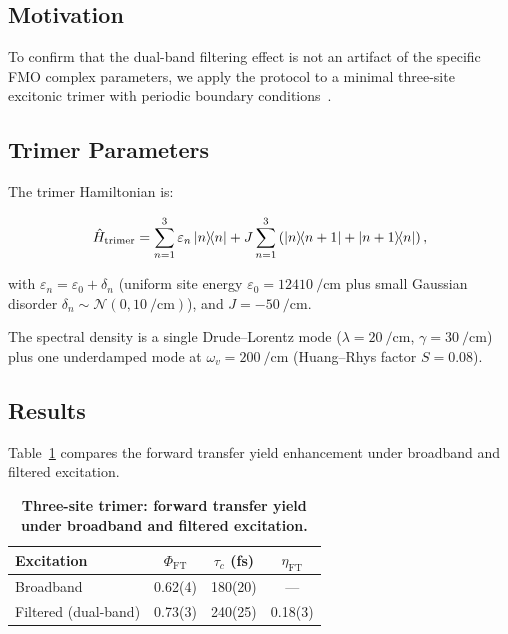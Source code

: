 \documentclass[11pt,a4paper]{article}
\begin{document}
\subsection{Motivation}

To confirm that the dual-band filtering effect is not an artifact of the specific FMO complex parameters, we apply the protocol to a minimal three-site excitonic trimer with periodic boundary conditions~\cite{Mohseni2008,Rebentrost2009,Chin2010}.

\subsection{Trimer Parameters}

The trimer Hamiltonian is:

\begin{equation}
\hat{H}_{\mathrm{trimer}} = \sum_{n=1}^{3} \varepsilon_n \dyad{n} + J \sum_{n=1}^{3} \left( \dyad{n}{n+1} + \dyad{n+1}{n} \right),
\label{eq:SI_trimer_hamiltonian}
\end{equation}

with $\varepsilon_n = \varepsilon_0 + \delta_n$ (uniform site energy $\varepsilon_0 = \SI{12410}{\per\cm}$ plus small Gaussian disorder $\delta_n \sim \mathcal{N}(0, \SI{10}{\per\cm})$), and $J = \SI{-50}{\per\cm}$.

The spectral density is a single Drude--Lorentz mode ($\lambda = \SI{20}{\per\cm}$, $\gamma = \SI{30}{\per\cm}$) plus one underdamped mode at $\omega_v = \SI{200}{\per\cm}$ (Huang--Rhys factor $S = 0.08$).

\subsection{Results}

Table~\ref{tab:SI_trimer_results} compares the forward transfer yield enhancement under broadband and filtered excitation.

\begin{table}[htbp]
\centering
\caption{\textbf{Three-site trimer: forward transfer yield under broadband and filtered excitation.}}
\label{tab:SI_trimer_results}
\begin{tabular}{lccc}
\toprule
Excitation & $\Phi_{\mathrm{FT}}$ & $\tau_c$ (fs) & $\eta_{\mathrm{FT}}$ \\
\midrule
Broadband & 0.62(4) & 180(20) & --- \\
Filtered (dual-band) & 0.73(3) & 240(25) & 0.18(3) \\
\bottomrule
\end{tabular}
\end{table}
\end{document}
